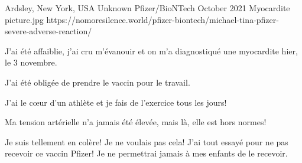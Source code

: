 {Ardsley, New York, USA}
{Unknown}
{Pfizer/BioNTech}
{October 2021}
{Myocardite}
{picture.jpg}
{https://nomoresilence.world/pfizer-biontech/michael-tina-pfizer-severe-adverse-reaction/}
{

J'ai été affaiblie, j'ai cru m'évanouir et on m'a diagnostiqué une myocardite
hier, le 3 novembre.

J'ai été obligée de prendre le vaccin pour le travail.

J'ai le cœur d'un athlète et je fais de l'exercice tous les jours!

Ma tension artérielle n'a jamais été élevée, mais là, elle est hors normes!

Je suis tellement en colère! Je ne voulais pas cela! J'ai tout essayé pour ne
pas recevoir ce vaccin Pfizer! Je ne permettrai jamais à mes enfants de le
recevoir.

}
